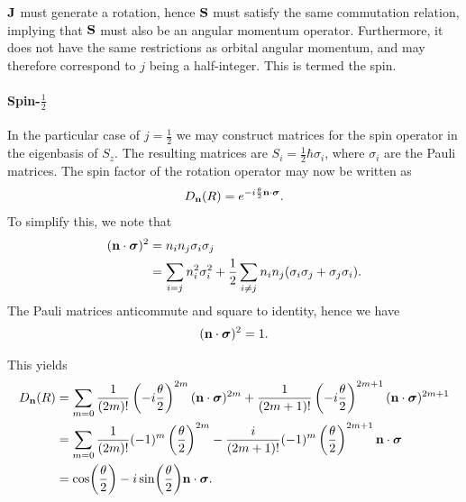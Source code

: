 $\vb{J}$ must generate a rotation, hence $\vb{S}$ must satisfy the same commutation relation, implying that $\vb{S}$ must also be an angular momentum operator. Furthermore, it does not have the same restrictions as orbital angular momentum, and may therefore correspond to $j$ being a half-integer. This is termed the spin.

\paragraph{Spin-$\frac{1}{2}$}
In the particular case of $j = \frac{1}{2}$ we may construct matrices for the spin operator in the eigenbasis of $S_{z}$. The resulting matrices are $S_{i} = \frac{1}{2}\hbar\sigma_{i}$, where $\sigma_{i}$ are the Pauli matrices. The spin factor of the rotation operator may now be written as
\begin{align*}
	D_{\vb{n}}(R) = e^{-i\frac{\theta}{2}\vb{n}\cdot\vb*{\sigma}}.
\end{align*}
To simplify this, we note that
\begin{align*}
(\vb{n}\cdot\vb*{\sigma})^{2} &= n_{i}n_{j}\sigma_{i}\sigma_{j} \\
                              &= \sum\limits_{i = j}n_{i}^{2}\sigma_{i}^{2} + \frac{1}{2}\sum\limits_{i\neq j}n_{i}n_{j}(\sigma_{i}\sigma_{j} + \sigma_{j}\sigma_{i}).
\end{align*}
The Pauli matrices anticommute and square to identity, hence we have
\begin{align*}
	(\vb{n}\cdot\vb*{\sigma})^{2} = 1.
\end{align*}

This yields
\begin{align*}
	D_{\vb{n}}(R) &= \sum\limits_{m = 0}\frac{1}{(2m)!}\left(-i\frac{\theta}{2}\right)^{2m}(\vb{n}\cdot\vb*{\sigma})^{2m} + \frac{1}{(2m + 1)!}\left(-i\frac{\theta}{2}\right)^{2m + 1}(\vb{n}\cdot\vb*{\sigma})^{2m + 1} \\
	              &= \sum\limits_{m = 0}\frac{1}{(2m)!}(-1)^{m}\left(\frac{\theta}{2}\right)^{2m} - \frac{i}{(2m + 1)!}(-1)^{m}\left(\frac{\theta}{2}\right)^{2m + 1}\vb{n}\cdot\vb*{\sigma} \\
	              &= \cos(\frac{\theta}{2}) - i\sin(\frac{\theta}{2})\vb{n}\cdot\vb*{\sigma}.
\end{align*}

